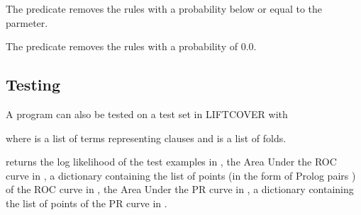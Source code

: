 \documentclass[letterpaper,10pt,english]{sphinxmanual}
\begin{document}
\sphinxAtStartPar
The predicate removes the rules with a probability below or equal to the  parmeter.

\begin{sphinxVerbatim}[commandchars=\\\{\}]
  
\end{sphinxVerbatim}

\sphinxAtStartPar
The predicate removes the rules with a probability of 0.0.


\subsection{Testing}
\label{\detokenize{index:testing}}
\sphinxAtStartPar
A program can also be tested on a test set in LIFTCOVER with

\begin{sphinxVerbatim}[commandchars=\\\{\}]
  
\end{sphinxVerbatim}

\sphinxAtStartPar
where  is a list of terms representing clauses and  is a list of folds.

\sphinxAtStartPar
{} returns the log likelihood of the test examples in , the Area Under the ROC curve in , a dictionary containing the list of points (in the form of Prolog pairs ) of the ROC curve in , the Area Under the PR curve in , a dictionary containing the list of points of the PR curve in .
\end{document}
